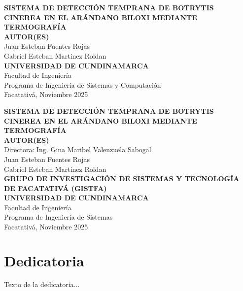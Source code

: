 \documentclass[12pt,openright,oneside]{book}
\begin{document}
\setcounter{page}{1}

\begin{titlepage}
    \begin{center}
        \vspace*{2cm}
        {\Large\textbf{SISTEMA DE DETECCIÓN TEMPRANA DE BOTRYTIS CINEREA EN EL ARÁNDANO BILOXI MEDIANTE TERMOGRAFÍA}}\\[4cm]
        {\large\textbf{AUTOR(ES)}}\\
        Juan Esteban Fuentes Rojas\\
        Gabriel Esteban Martinez Roldan\\[6cm]
        \textbf{UNIVERSIDAD DE CUNDINAMARCA}\\
        Facultad de Ingeniería\\
        Programa de Ingeniería de Sistemas y Computación\\
        Facatativá, Noviembre 2025
    \end{center}
\end{titlepage}

\newpage
\thispagestyle{empty}
\begin{center}
    \vspace*{2cm}
    {\Large\textbf{SISTEMA DE DETECCIÓN TEMPRANA DE BOTRYTIS CINEREA EN EL ARÁNDANO BILOXI MEDIANTE TERMOGRAFÍA}}\\[3cm]
    {\large\textbf{AUTOR(ES)}}\\
    Directora: Ing. Gina Maribel Valenzuela Sabogal\\
    Juan Esteban Fuentes Rojas\\
    Gabriel Esteban Martinez Roldan\\[3cm]
    \textbf{GRUPO DE INVESTIGACIÓN DE SISTEMAS Y TECNOLOGÍA DE FACATATIVÁ (GISTFA)}\\[3cm]
    \textbf{UNIVERSIDAD DE CUNDINAMARCA}\\
    Facultad de Ingeniería\\
    Programa de Ingeniería de Sistemas\\
    Facatativá, Noviembre 2025
\end{center}

\chapter*{Dedicatoria}
Texto de la dedicatoria...
\end{document}
